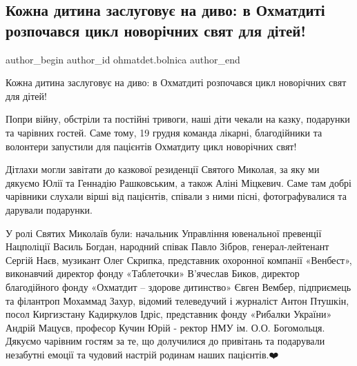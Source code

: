  
 
 
 
 
 
\subsection{Кожна дитина заслуговує на диво: в Охматдиті розпочався цикл новорічних свят для дітей!}
\label{sec:22_12_2022.fb.ohmatdet.bolnica.1.dytyna_svjato}
 
\ifcmt
 author_begin
   author_id ohmatdet.bolnica
 author_end
\fi

Кожна дитина заслуговує на диво: в Охматдиті розпочався цикл новорічних свят
для дітей!💫🎄

Попри війну, обстріли та постійні тривоги, наші діти чекали на казку, подарунки
та чарівних гостей. Саме тому, 19 грудня команда лікарні, благодійники та
волонтери запустили для пацієнтів Охматдиту цикл новорічних свят!🎊

Дітлахи могли завітати до казкової резиденції Святого Миколая, за яку ми
дякуємо Юлії та Геннадію Рашковським, а також Аліні Міцкевич. Саме там добрі
чарівники слухали вірші від пацієнтів, співали з ними пісні, фотографувалися та
дарували подарунки.🎁

У ролі Святих Миколаїв були: начальник Управління ювенальної превенції
Нацполіції Василь Богдан, народний співак Павло Зібров, генерал-лейтенант
Сергій Наєв, музикант Олег Скрипка, представник охоронної компанії «Венбест»,
виконавчий директор фонду «Таблеточки» В'ячеслав Биков, директор благодійного
фонду «Охматдит – здорове дитинство» Євген Вембер, підприємець та філантроп
Мохаммад Захур, відомий телеведучий і журналіст Антон Птушкін, посол
Киргизстану Кадиркулов Ідріс, представник фонду «Рибалки України» Андрій
Мацуєв, професор Кучин Юрій - ректор НМУ ім. О.О. Богомольця. Дякуємо чарівним
гостям за те, що долучилися до привітань та подарували незабутні емоції та
чудовий настрій родинам наших пацієнтів.❤️

